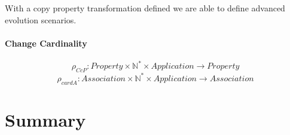 \documentclass[11pt]{article}
\begin{document}
With a copy property transformation defined we are able to define advanced evolution scenarios.

\paragraph{Change Cardinality}
$$\rho_{CcP} : Property \times \mathbb{N^{*}} \times Application \rightarrow Property $$
$$\rho_{cardA} : Association \times \mathbb{N^{*}} \times Application \rightarrow Association $$

\section{Summary}
\end{document}
